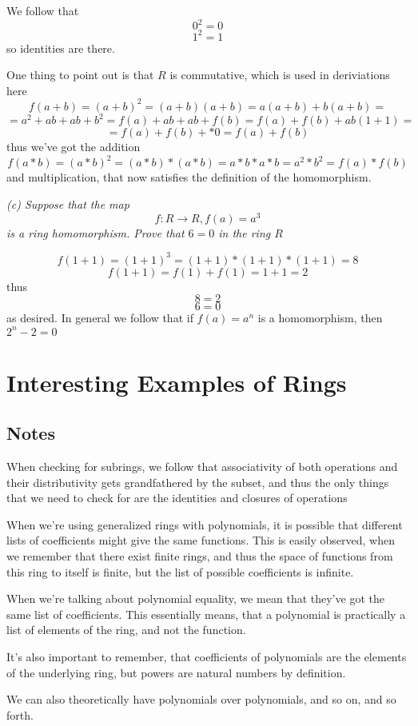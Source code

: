 \documentclass[11pt,oneside,titlepage]{book}
\begin{document}
We follow that
$$0^2 = 0$$
$$1^2 = 1$$
so identities are there.

One thing to point out is that $R$ is commutative, which is used in
deriviations here
$$f(a + b) = (a + b)^2 = (a + b)(a + b) = a(a + b) + b(a + b) = $$
$$ = a^2 + ab + ab + b^2 = f(a) + ab + ab + f(b) = f(a) + f(b) + ab(1 + 1) = $$
$$ = f(a) + f(b) +  * 0 = f(a) + f(b)$$
thus we've got the addition
$$f(a * b) = (a * b)^2 = (a * b) * (a * b) = a * b * a * b = a^2 * b^2 = f(a) * f(b)$$
and multiplication, that now satisfies the definition of the
homomorphism.

\textit{(c) Suppose that the map
  $$f: R \to R, f(a) = a^3$$
  is a ring homomorphism. Prove that $6 = 0$ in the ring $R$}

$$ f(1 + 1) = (1 + 1)^3 = (1 + 1) * (1 + 1) * (1 + 1) = 8$$
$$ f(1 + 1) = f(1) + f(1) = 1 + 1 = 2$$
thus
$$8 = 2$$
$$6 = 0$$
as desired. In general we follow that if $f(a) = a^n$ is a
homomorphism, then $2^n - 2 = 0$

\section{Interesting Examples of Rings}

\subsection*{Notes}

When checking for subrings, we follow that associativity of both operations
and their distributivity gets grandfathered by the subset, and thus
the only things that we need to check for are the identities and closures
of operations 

When we're using generalized rings with polynomials, it is possible
that different lists of coefficients might give the same functions.
This is easily observed, when we remember that there exist finite
rings, and thus the space of functions from this ring to itself is
finite, but the list of possible coefficients is infinite.

When we're talking about polynomial equality, we mean that they've got
the same list of coefficients. This essentially means, that a
polynomial is practically a list of elements of the ring, and not the
function.

It's also important to remember, that coefficients of polynomials are
the elements of the underlying ring, but powers are natural
numbers by definition.

We can also theoretically have polynomials over polynomials, and so on,
and so forth.
\end{document}
